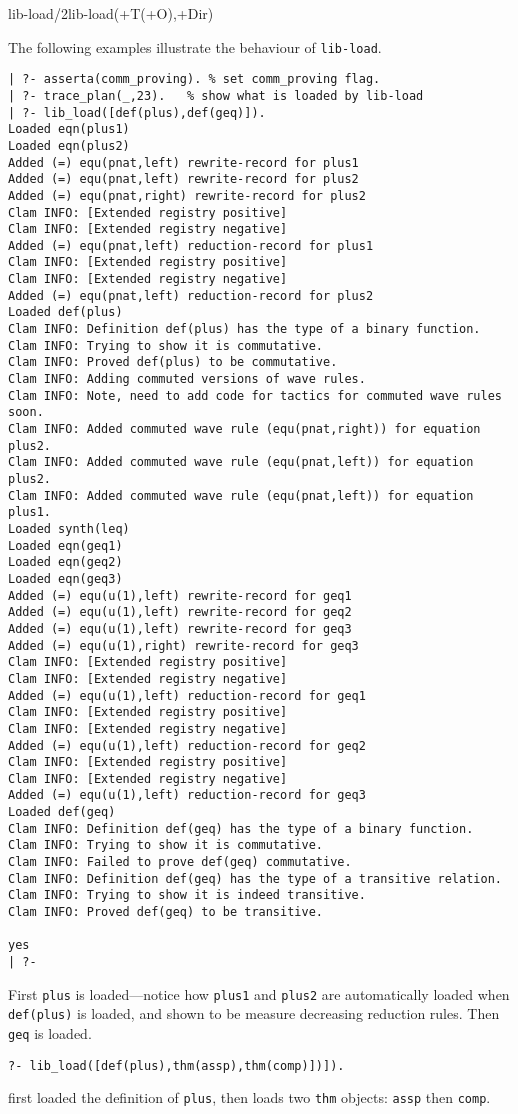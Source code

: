 \begin{predicate}{lib-load/2}{lib-load(+T(+O),+Dir)}
\begin{ex}The following examples illustrate the behaviour of {\tt lib-load}.
\begin{verbatim}
| ?- asserta(comm_proving). % set comm_proving flag.
| ?- trace_plan(_,23).   % show what is loaded by lib-load
| ?- lib_load([def(plus),def(geq)]).
Loaded eqn(plus1)
Loaded eqn(plus2)
Added (=) equ(pnat,left) rewrite-record for plus1
Added (=) equ(pnat,left) rewrite-record for plus2
Added (=) equ(pnat,right) rewrite-record for plus2
Clam INFO: [Extended registry positive] 
Clam INFO: [Extended registry negative] 
Added (=) equ(pnat,left) reduction-record for plus1
Clam INFO: [Extended registry positive] 
Clam INFO: [Extended registry negative] 
Added (=) equ(pnat,left) reduction-record for plus2
Loaded def(plus)
Clam INFO: Definition def(plus) has the type of a binary function.
Clam INFO: Trying to show it is commutative.
Clam INFO: Proved def(plus) to be commutative.
Clam INFO: Adding commuted versions of wave rules.
Clam INFO: Note, need to add code for tactics for commuted wave rules soon.
Clam INFO: Added commuted wave rule (equ(pnat,right)) for equation plus2.
Clam INFO: Added commuted wave rule (equ(pnat,left)) for equation plus2.
Clam INFO: Added commuted wave rule (equ(pnat,left)) for equation plus1.
Loaded synth(leq)
Loaded eqn(geq1)
Loaded eqn(geq2)
Loaded eqn(geq3)
Added (=) equ(u(1),left) rewrite-record for geq1
Added (=) equ(u(1),left) rewrite-record for geq2
Added (=) equ(u(1),left) rewrite-record for geq3
Added (=) equ(u(1),right) rewrite-record for geq3
Clam INFO: [Extended registry positive] 
Clam INFO: [Extended registry negative] 
Added (=) equ(u(1),left) reduction-record for geq1
Clam INFO: [Extended registry positive] 
Clam INFO: [Extended registry negative] 
Added (=) equ(u(1),left) reduction-record for geq2
Clam INFO: [Extended registry positive] 
Clam INFO: [Extended registry negative] 
Added (=) equ(u(1),left) reduction-record for geq3
Loaded def(geq)
Clam INFO: Definition def(geq) has the type of a binary function.
Clam INFO: Trying to show it is commutative.
Clam INFO: Failed to prove def(geq) commutative.
Clam INFO: Definition def(geq) has the type of a transitive relation.
Clam INFO: Trying to show it is indeed transitive.
Clam INFO: Proved def(geq) to be transitive.

yes
| ?- 
\end{verbatim}
First {\tt plus} is loaded---notice how {\tt plus1} and {\tt plus2}
are automatically loaded when {\tt def(plus)} is loaded, and shown to
be measure decreasing reduction rules.  Then {\tt geq} is loaded.  

\begin{verbatim}
?- lib_load([def(plus),thm(assp),thm(comp)])]).
\end{verbatim}
first loaded the definition of {\tt plus}, then loads two {\tt thm}
objects: {\tt assp} then {\tt comp}.
\end{ex}
\end{predicate}

